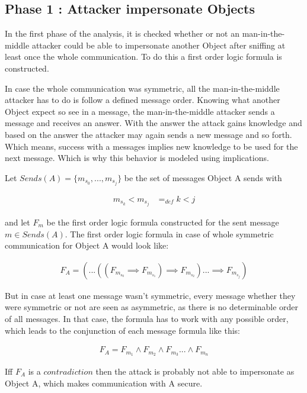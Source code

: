 \documentclass[12pt,journal,compsoc]{IEEEtran}
\newcommand{\Peer}[0]{Object }
\newcommand{\Peers}[0]{Objects }
\newcommand{\FOL}[0]{first order logic }
\newcommand{\MITMA}[0]{man-in-the-middle attacker }
\newcommand{\linesep}[0]{\newline}
\begin{document}
\subsection{Phase 1 : Attacker impersonate \Peers}

In the first phase of the analysis, it is checked whether or not 
an \MITMA could be able to impersonate another \Peer after sniffing at least 
once the whole communication. To do this a \FOL formula is constructed.
\linesep

In case the whole communication was symmetric, all the \MITMA has 
to do is follow a defined message order. Knowing what another \Peer 
expect so see in a message, the \MITMA sends a message and receives 
an answer. With the answer the attack gains knowledge and based on the answer 
the attacker may again sends a new message and so forth. Which means, 
success with a messages implies new knowledge to be used for the next 
message. Which is why this behavior is modeled using implications.
\linesep

Let $Sends(A) = \{ m_{s_0} , ... , m_{s_j} \}$ be the set of messages \Peer A sends with 
\begin{small}
\begin{align*}
m_{s_k} < m_{s_j} 	&=_{def} k < j 
\end{align*}
\end{small}
and let $F_m$ be the \FOL formula constructed for the sent message $m \in Sends(A)$.
The \FOL formula in case of whole symmetric communication for \Peer A would look like:
%
\begin{small}
\begin{align*}
F_A = ( ... ((F_{m_{s_0}} \implies F_{m_{s_1}}) \implies F_{m_{s_2}}) ... \implies F_{m_{s_j}})
\end{align*}
\end{small}
%
But in case at least one message wasn't symmetric, every message whether they 
were symmetric or not are seen as asymmetric, as there is no determinable order 
of all messages. In that case, the formula has to work with any possible order, 
which leads to the conjunction of each message formula like this:
%
\begin{small}
\begin{align*}
F_A = F_{m_1} \wedge F_{m_2} \wedge F_{m_3} ... \wedge F_{m_n}
\end{align*}
\end{small}
%
Iff $F_A$ is a $contradiction$ then the attack is probably not able to impersonate as \Peer A, 
which makes communication with A secure.
\end{document}
